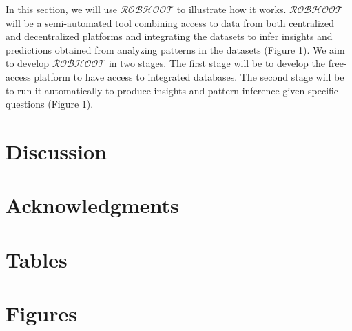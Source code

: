 \documentclass[english,12pt]{article}
\begin{document}
In this section, we will use $\mathcal{ROBHOOT}$ to illustrate how it
works. $\mathcal{ROBHOOT}$ will be a semi-automated tool combining
access to data from both centralized and decentralized platforms and
integrating the datasets to infer insights and predictions obtained
from analyzing patterns in the datasets (Figure 1). We aim to develop
$\mathcal{ROBHOOT}$ in two stages. The first stage will be to develop
the free-access platform to have access to integrated databases. The
second stage will be to run it automatically to produce insights and
pattern inference given specific questions (Figure 1). 

\section{Discussion}


\newpage
\section{Acknowledgments}


\newpage



\newpage

\section{Tables}


\newpage

\section{Figures}
\end{document}

